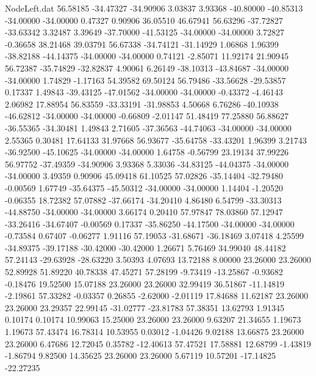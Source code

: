 \begin{filecontents}{NodeLeft.dat}
  56.58185  -34.47327  -34.90906     3.03837    3.93368  -40.80000  -40.85313  -34.00000  -34.00000    0.47327    0.90906   36.05510   46.67941
  56.63296  -37.72827  -33.63342     3.32487    3.39649  -37.70000  -41.53125  -34.00000  -34.00000    3.72827   -0.36658   38.21468   39.03791
  56.67338  -34.74121  -31.14929     1.06868    1.96399  -38.82188  -44.14375  -34.00000  -34.00000    0.74121   -2.85071   11.92174   21.90945
  56.72387  -35.74829  -32.82837     4.90061    6.26149  -38.10313  -43.84687  -34.00000  -34.00000    1.74829   -1.17163   54.39582   69.50124
  56.79486  -33.56628  -29.53857     0.17337    1.49843  -39.43125  -47.01562  -34.00000  -34.00000   -0.43372   -4.46143    2.06982   17.88954
  56.83559  -33.33191  -31.98853     4.50668    6.76286  -40.10938  -46.62812  -34.00000  -34.00000   -0.66809   -2.01147   51.48419   77.25880
  56.88627  -36.55365  -34.30481     1.49843    2.71605  -37.36563  -44.74063  -34.00000  -34.00000    2.55365    0.30481   17.64133   31.97668
  56.93677  -35.64758  -33.43201     1.96399    3.21743  -36.92500  -45.10625  -34.00000  -34.00000    1.64758   -0.56799   23.19134   37.99226
  56.97752  -37.49359  -34.90906     3.93368    5.33036  -34.83125  -44.04375  -34.00000  -34.00000    3.49359    0.90906   45.09418   61.10525
  57.02826  -35.14404  -32.79480    -0.00569    1.67749  -35.64375  -45.50312  -34.00000  -34.00000    1.14404   -1.20520   -0.06355   18.72382
  57.07882  -37.66174  -34.20410     4.86480    6.54799  -33.30313  -44.88750  -34.00000  -34.00000    3.66174    0.20410   57.97847   78.03860
  57.12947  -33.26416  -34.67407    -0.00569    0.17337  -35.86250  -44.17500  -34.00000  -34.00000   -0.73584    0.67407   -0.06277    1.91116
  57.19053  -31.68671  -36.18469     3.07418    4.25599  -34.89375  -39.17188  -30.42000  -30.42000    1.26671    5.76469   34.99040   48.44182
  57.24143  -29.63928  -28.63220     3.50393    4.07693   13.72188    8.00000   23.26000   23.26000   52.89928   51.89220   40.78338   47.45271
  57.28199   -9.73419  -13.25867    -0.93682   -0.18476   19.52500   15.07188   23.26000   23.26000   32.99419   36.51867  -11.14819   -2.19861
  57.33282   -0.03357    0.26855    -2.62000   -2.01119   17.84688   11.62187   23.26000   23.26000   23.29357   22.99145  -31.02777  -23.81783
  57.38351   13.62793    1.91345     0.10174    0.10174   10.99063   15.25000   23.26000   23.26000    9.63207   21.34655    1.19673    1.19673
  57.43474   16.78314   10.53955     0.03012   -1.04426    9.02188   13.66875   23.26000   23.26000    6.47686   12.72045    0.35782  -12.40613
  57.47521   17.58881   12.68799    -1.43819   -1.86794    9.82500   14.35625   23.26000   23.26000    5.67119   10.57201  -17.14825  -22.27235

\end{filecontents}
